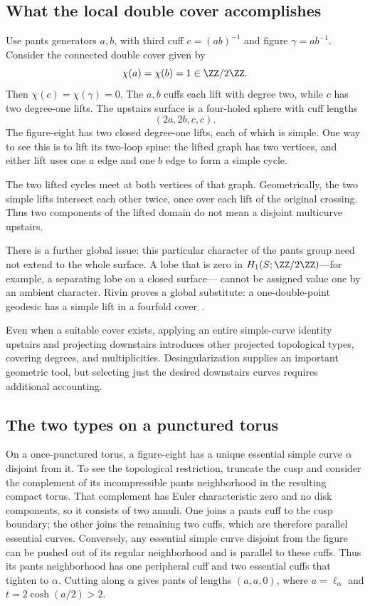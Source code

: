 \subsection{What the local double cover accomplishes}

Use pants generators $a,b$, with third cuff $c=(ab)^{-1}$ and figure
$\gamma=ab^{-1}$. Consider the connected double cover given by
\[
 \chi(a)=\chi(b)=1\in\ZZ/2\ZZ.
\]
Then $\chi(c)=\chi(\gamma)=0$. The $a,b$ cuffs each lift with degree two,
while $c$ has two degree-one lifts. The upstairs surface is a four-holed
sphere with cuff lengths
\begin{equation}
 (2a,2b,c,c).
 \label{eq:doublepants}
\end{equation}
The figure-eight has two closed degree-one lifts, each of which is simple.
One way to see this is to lift its two-loop spine: the lifted graph has
two vertices, and either lift uses one $a$ edge and one $b$ edge to form
a simple cycle.

The two lifted cycles meet at both vertices of that graph. Geometrically,
the two simple lifts intersect each other twice, once over each lift of
the original crossing. Thus two components of the lifted domain do not
mean a disjoint multicurve upstairs.

There is a further global issue: this particular character of the pants
group need not extend to the whole surface. A lobe that is zero in
$H_1(S;\ZZ/2\ZZ)$---for example, a separating lobe on a closed surface---
cannot be assigned value one by an ambient character.
Rivin proves a global substitute: a one-double-point geodesic has a simple
lift in a fourfold cover~\cite[Theorem 4.2]{RivinFigures}.

Even when a suitable cover exists, applying an entire simple-curve identity
upstairs and projecting downstairs introduces other projected topological
types, covering degrees, and multiplicities. Desingularization supplies
an important geometric tool, but selecting just the desired downstairs
curves requires additional accounting.

\subsection{The two types on a punctured torus}

On a once-punctured torus, a figure-eight has a unique essential simple
curve $\alpha$ disjoint from it. To see the topological restriction,
truncate the cusp and consider the complement of its incompressible
pants neighborhood in the resulting compact torus. That complement has
Euler characteristic zero and no disk components, so it consists of two
annuli. One joins a pants cuff to the cusp boundary; the other joins the
remaining two cuffs, which are therefore parallel essential curves.
Conversely, any essential simple
curve disjoint from the figure can be pushed out of its regular
neighborhood and is parallel to these cuffs. Thus its pants neighborhood
has one peripheral cuff and two essential cuffs that tighten to $\alpha$.
Cutting along $\alpha$ gives pants of lengths $(a,a,0)$, where
$a=\ell_\alpha$ and $t=2\cosh(a/2)>2$.

